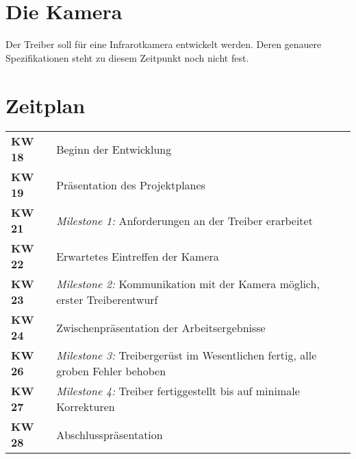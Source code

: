 \documentclass[10pt,a4paper]{article}
\begin{document}
\section{Die Kamera}
Der Treiber soll für eine Infrarotkamera entwickelt werden. Deren genauere Spezifikationen steht zu diesem Zeitpunkt noch nicht fest.

\section{Zeitplan}

\renewcommand{\arraystretch}{2}
\begin{tabularx}{\textwidth}{lX}
\textbf{KW 18} & Beginn der Entwicklung \\
\textbf{KW 19} & Präsentation des Projektplanes \\
\textbf{KW 21} & \emph{Milestone 1:} Anforderungen an der Treiber erarbeitet \\
\textbf{KW 22} & Erwartetes Eintreffen der Kamera \\
\textbf{KW 23} & \emph{Milestone 2:} Kommunikation mit der Kamera möglich, erster Treiberentwurf \\
\textbf{KW 24} & Zwischenpräsentation der Arbeitsergebnisse \\
\textbf{KW 26} & \emph{Milestone 3:} Treibergerüst im Wesentlichen fertig, alle groben Fehler behoben \\
\textbf{KW 27} & \emph{Milestone 4:} Treiber fertiggestellt bis auf minimale Korrekturen \\
\textbf{KW 28} & Abschlusspräsentation \\
\end{tabularx}
\end{document}
